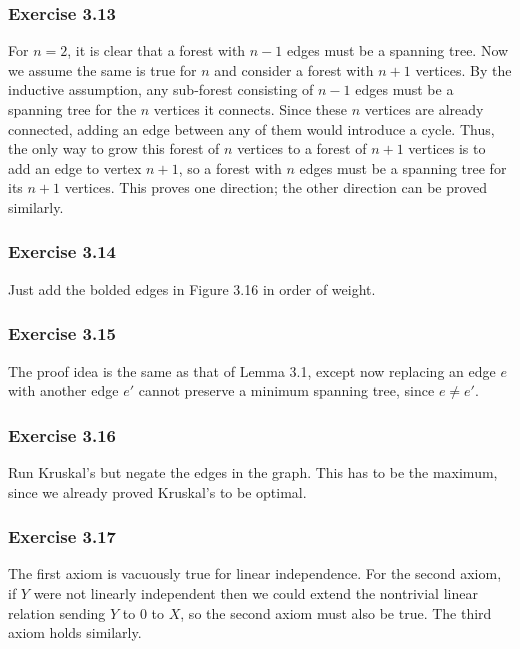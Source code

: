 \subsubsection{Exercise 3.13}
For $n = 2$, it is clear that a forest with $n-1$ edges must be a spanning tree. Now we assume the
same is true for $n$ and consider a forest with $n + 1$ vertices. By the inductive assumption, any sub-forest
consisting of $n - 1$ edges must be a spanning tree for the $n$ vertices it connects. Since these $n$ vertices
are already connected, adding an edge between any of them would introduce a cycle. Thus, the only way to grow
this forest of $n$ vertices to a forest of $n + 1$ vertices is to add an edge to vertex $n + 1$, so a forest
with  $n$ edges must be a spanning tree for its $n + 1$ vertices. This proves one direction; the other 
direction can be proved similarly.

\subsubsection{Exercise 3.14}
Just add the bolded edges in Figure 3.16 in order of weight.

\subsubsection{Exercise 3.15}
The proof idea is the same as that of Lemma 3.1, except now replacing an edge $e$ with another edge $e'$ cannot
preserve a minimum spanning tree, since $e \neq e'$.

\subsubsection{Exercise 3.16}
Run Kruskal's but negate the edges in the graph. This has to be the maximum, since we already proved Kruskal's
to be optimal.

\subsubsection{Exercise 3.17}
The first axiom is vacuously true for linear independence. For the second axiom, if $Y$ were not linearly 
independent then we could extend the nontrivial linear relation sending $Y$ to 0 to $X$, so the second axiom
must also be true. The third axiom holds similarly.


